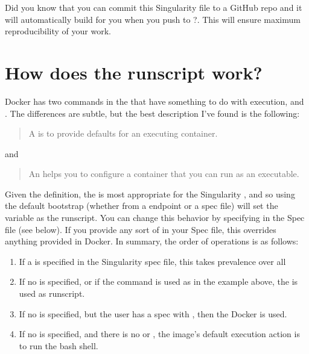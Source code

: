 \documentclass[letterpaper,10pt,english]{sphinxmanual}
\begin{document}
Did you know that you can commit this Singularity file to a GitHub repo
and it will automatically build for you when you push to ?. This will ensure maximum reproducibility of your work.


\section{How does the runscript work?}
\label{\detokenize{singularity_and_docker:how-does-the-runscript-work}}
Docker has two commands in the  that have something to do with
execution,  and . The differences are subtle, but the best description
I’ve found is the following:
\begin{quote}

A  is to provide defaults for an executing container.
\end{quote}

and
\begin{quote}

An  helps you to configure a container that you can run as an
executable.
\end{quote}

Given the definition, the  is most appropriate for the Singularity  , and
so using the default bootstrap (whether from a  endpoint or a  spec file)
will set the  variable as the runscript. You can change this behavior by
specifying  in the Spec file (see below). If you provide any sort of  in
your Spec file, this overrides anything provided in Docker. In summary,
the order of operations is as follows:
\begin{enumerate}
\item {} 
If a  is specified in the Singularity spec file, this takes prevalence
over all

\item {} 
If no  is specified, or if the  command is used as in the example
above, the  is used as runscript.

\item {} 
If no  is specified, but the user has a  spec with  , then the Docker  is
used.

\item {} 
If no  is specified, and there is no  or  , the image’s default
execution action is to run the bash shell.

\end{enumerate}
\end{document}
